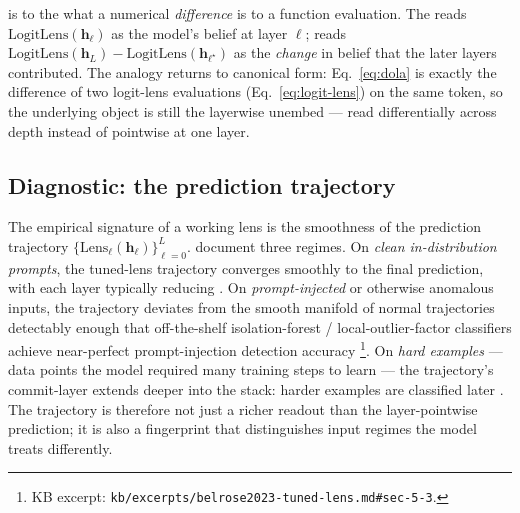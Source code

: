 \begin{analogy}
 is to the  what a numerical \emph{difference} is to a
function evaluation. The  reads
$\mathrm{LogitLens}(\mathbf{h}_\ell)$ as the model's belief at layer
$\ell$;  reads
$\mathrm{LogitLens}(\mathbf{h}_L) - \mathrm{LogitLens}(\mathbf{h}_{\ell^\star})$
as the \emph{change} in belief that the later layers contributed. The
analogy returns to canonical form: Eq.~\eqref{eq:dola} is exactly the
difference of two logit-lens evaluations
(Eq.~\eqref{eq:logit-lens}) on the same token, so the underlying
object is still the layerwise unembed — read differentially across
depth instead of pointwise at one layer.
\end{analogy}

\subsection{Diagnostic: the prediction trajectory}
\label{sec:lens-trajectory}

The empirical signature of a working lens is the smoothness of the
prediction trajectory $\{\mathrm{Lens}_\ell(\mathbf{h}_\ell)\}_{\ell=0}^L$.
\citet[\S 1]{belrose2023-tuned-lens} document three regimes. On
\emph{clean in-distribution prompts}, the tuned-lens trajectory
converges smoothly to the final prediction, with each layer typically
reducing . On \emph{prompt-injected} or otherwise anomalous
inputs, the trajectory deviates from the smooth manifold of normal
trajectories detectably enough that off-the-shelf isolation-forest /
local-outlier-factor classifiers achieve near-perfect prompt-injection
detection accuracy \citep[\S 5.3]{belrose2023-tuned-lens}\footnote{KB
excerpt: \texttt{kb/excerpts/belrose2023-tuned-lens.md\#sec-5-3}.}. On
\emph{hard examples} — data points the model required many training
steps to learn — the trajectory's commit-layer extends deeper into the
stack: harder examples are classified later
\citep[\S 5.4]{belrose2023-tuned-lens}. The trajectory is therefore
not just a richer readout than the layer-pointwise prediction; it is
also a fingerprint that distinguishes input regimes the model treats
differently.

